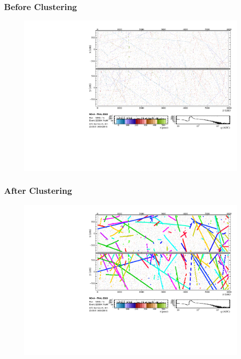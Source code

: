 \documentclass[10pt,professionalfonts,xcolor=table]{beamer}
\begin{document}
\frame
{
  \frametitle{Before Clustering}

 \begin{figure} \includegraphics[height=0.9\textwidth, angle=-90]{figures/evd_steps/evd_hits.pdf} \end{figure}
}

\frame
{
  \frametitle{After Clustering}

 \begin{figure} \includegraphics[height=0.9\textwidth, angle=-90]{figures/evd_steps/evd_slice.pdf} \end{figure}
}
\end{document}
